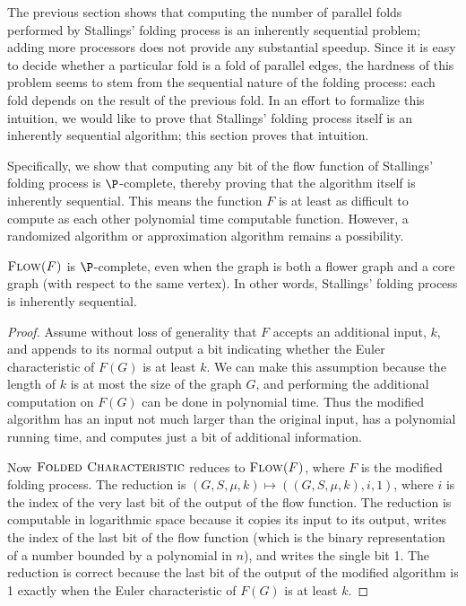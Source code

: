 \documentclass{article}
\newcommand{\FC}{\textsc{Folded Characteristic}}
\newcommand{\Flow}{\textsc{Flow($F$)}}
\begin{document}
The previous section shows that computing the number of parallel folds performed by Stallings' folding process is an inherently sequential problem; adding more processors does not provide any substantial speedup.
Since it is easy to decide whether a particular fold is a fold of parallel edges, the hardness of this problem seems to stem from the sequential nature of the folding process: each fold depends on the result of the previous fold.
In an effort to formalize this intuition, we would like to prove that Stallings' folding process itself is an inherently sequential algorithm;
this section proves that intuition.

%
Specifically, we show that computing any bit of the flow function of Stallings' folding process is $\P$-complete, thereby proving that the algorithm itself is inherently sequential.
This means the function $F$ is at least as difficult to compute as each other polynomial time computable function.
However, a randomized algorithm or approximation algorithm remains a possibility.

\begin{theorem}
  $\Flow$ is $\P$-complete, even when the graph is both a flower graph and a core graph (with respect to the same vertex).
  In other words, Stallings' folding process is inherently sequential.
\end{theorem}
\begin{proof}
  Assume without loss of generality that $F$ accepts an additional input, $k$, and appends to its normal output a bit indicating whether the Euler characteristic of $F(G)$ is at least $k$.
  We can make this assumption because the length of $k$ is at most the size of the graph $G$, and performing the additional computation on $F(G)$ can be done in polynomial time.
  Thus the modified algorithm has an input not much larger than the original input, has a polynomial running time, and computes just a bit of additional information.

  Now $\FC$ reduces to $\Flow$, where $F$ is the modified folding process.
  The reduction is $(G, S, \mu, k) \mapsto ((G, S, \mu, k), i, 1)$, where $i$ is the index of the very last bit of the output of the flow function.
  The reduction is computable in logarithmic space because it copies its input to its output, writes the index of the last bit of the flow function (which is the binary representation of a number bounded by a polynomial in $n$), and writes the single bit 1.
  The reduction is correct because the last bit of the output of the modified algorithm is 1 exactly when the Euler characteristic of $F(G)$ is at least $k$.
\end{proof}

\printbibliography
\end{document}
